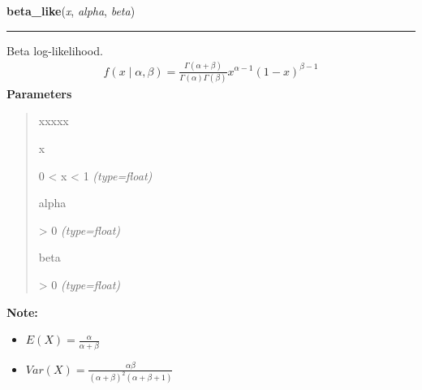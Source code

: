 \hspace{.8\funcindent}\begin{boxedminipage}{\funcwidth}

    \raggedright \textbf{beta\_like}(\textit{x}, \textit{alpha}, \textit{beta})

    \vspace{-1.5ex}

    \rule{\textwidth}{0.5\fboxrule}
\setlength{\parskip}{2ex}

Beta log-likelihood.
\begin{equation*}\begin{split}f(x \mid \alpha, \beta) = \frac{\Gamma(\alpha + \beta)}{\Gamma(\alpha) \Gamma(\beta)} x^{\alpha - 1} (1 - x)^{\beta - 1}\end{split}\end{equation*}\setlength{\parskip}{1ex}
      \textbf{Parameters}
      \vspace{-1ex}

      \begin{quote}
        \begin{Ventry}{xxxxx}

          \item[x]


0 {\textless} x {\textless} 1
            {\it (type=float)}

          \item[alpha]


{\textgreater} 0
            {\it (type=float)}

          \item[beta]


{\textgreater} 0
            {\it (type=float)}

        \end{Ventry}

      \end{quote}

\textbf{Note:} \begin{itemize}
\item {} 
$E(X)=\frac{\alpha}{\alpha+\beta}$

\item {} 
$Var(X)=\frac{\alpha \beta}{(\alpha+\beta)^2(\alpha+\beta+1)}$

\end{itemize}


    \end{boxedminipage}

    \label{pymc:distributions:binomial_like}

